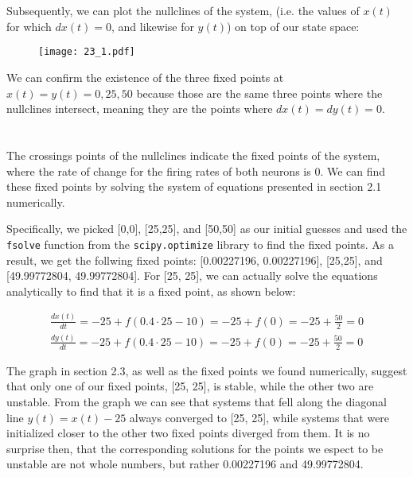 \documentclass{article}
\begin{document}
\section{}
Subsequently, we can plot the nullclines of the system, (i.e. the values of $x(t)$ for which $dx(t) = 0$, and likewise for $y(t)$) on top of our state space:

\begin{figure}[ht]
    \centering
    \texttt{[image: 23\_1.pdf]}
\end{figure}

We can confirm the existence of the three fixed points at $x(t) = y(t) = 0, 25, 50$ because those are the same three points where the nullclines intersect, meaning they are the points where $dx(t) = dy(t) = 0$.
\vspace{1em}



\section{}
The crossings points of the nullclines indicate the fixed points of the system, where the rate of change for the firing rates of both neurons is 0. We can find these fixed points by solving the system of equations presented in section 2.1 numerically.
\vspace{1em}

Specifically, we picked [0,0], [25,25], and [50,50] as our initial guesses and used the \texttt{fsolve} function from the \texttt{scipy.optimize} library to find the fixed points. As a result, we get the follwing fixed points: [0.00227196, 0.00227196], [25,25], and [49.99772804, 49.99772804]. For [25, 25], we can actually solve the equations analytically to find that it is a fixed point, as shown below:

\begin{align}
    \frac{dx(t)}{dt} = -25 + f(0.4 \cdot 25 - 10) = -25 + f(0) = -25 + \frac{50}{2} = 0 \\[1em]
    \frac{dy(t)}{dt} = -25 + f(0.4 \cdot 25 - 10) = -25 + f(0) = -25 + \frac{50}{2} = 0
\end{align}
\vspace{.1em}

The graph in section 2.3, as well as the fixed points we found numerically, suggest that only one of our fixed points, [25, 25], is stable, while the other two are unstable. From the graph we can see that systems that fell along the diagonal line $y(t) = x(t) - 25$ always converged to [25, 25], while systems that were initialized closer to the other two fixed points diverged from them. It is no surprise then, that the corresponding solutions for the points we espect to be unstable are not whole numbers, but rather 0.00227196 and 49.99772804.
\vspace{1em}
\end{document}
